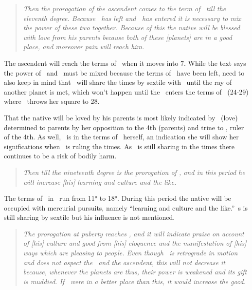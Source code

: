 \begin{quote}
\textsl{Then the prorogation of the ascendent comes to the term of \Venus\, till the eleventh degree. Because \Mars\, has left and \Venus\, has entered it is necessary to mix the power of these two together. Because of this the native will be blessed with love from his parents because both of these [planets] are in a good place, and moreover pain will reach him.}
\end{quote}

The ascendent will reach the terms of \Venus\, when it moves into 7\Scorpio. While the text says the power of \Mars\, and \Venus\, must be mixed because the terms of \Mars\, have been left, need to also keep in mind that \Mars\, will share the times by sextile with \Venus\, until the ray of another planet is met, which won't happen until the \ASC\, enters the terms of \Saturn\, (24-29\Scorpio) where \Venus\, throws her square to 28\Scorpio.

That the native will be loved by his parents is most likely indicated by \Venus\, (love) determined to parents by her opposition to the 4th (parents) and trine to \Saturn, ruler of the 4th. As well, \Venus\, is in the terms of \Mars\, herself, an indication she will show her significations when \Mars\, is ruling the times. As \Mars\, is still sharing in the times there continues to be a risk of bodily harm. 

\begin{quote}
\textsl{Then till the nineteenth degree is the prorogation of \Mercury, and in this period he will increase [his] learning and culture and the like.}
\end{quote}

The terms of \Mercury\, in \Scorpio\, run from 11° to 18°. During this period the native will be occupied with mercurial pursuits, namely ``learning and culture and the like.'' \Mars\,s is still sharing by sextile but his influence is not mentioned.

\begin{quote}
\textsl{The prorogation at puberty reaches \Jupiter, and it will indicate praise on account of [his] culture and good from [his] eloquence and the manifestation of [his] ways which are pleasing to people. Even though \Jupiter\, is retrograde in motion and does not aspect the \Moon\, and the ascendent, this will not decrease it because, whenever the planets are thus, their power is weakened and its gift is muddied. If \Jupiter\, were in a better place than this, it would increase the good.}
\end{quote}

